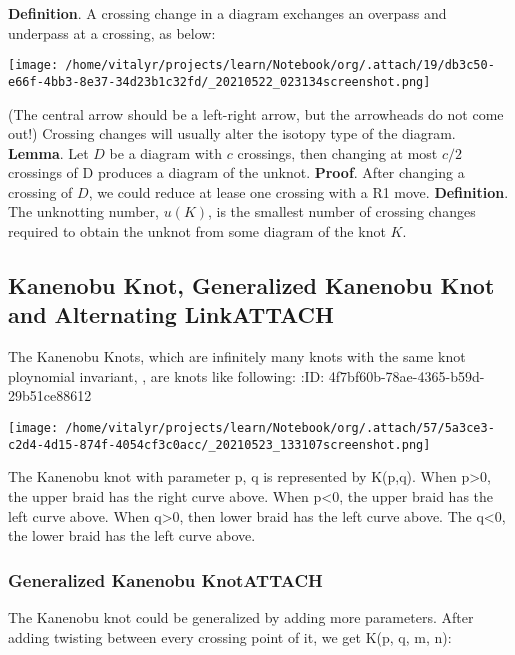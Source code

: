 \documentclass[a4paper]{article}
\begin{document}
\textbf{Definition}. A crossing change in a diagram exchanges an overpass and underpass at a crossing, as below:

\begin{center}
\texttt{[image: /home/vitalyr/projects/learn/Notebook/org/.attach/19/db3c50-e66f-4bb3-8e37-34d23b1c32fd/\_20210522\_023134screenshot.png]}
\end{center}
(The central arrow should be a left-right arrow, but the arrowheads do not come out!)
Crossing changes will usually alter the isotopy type of the diagram.
\textbf{Lemma}. Let \(D\) be a diagram with \(c\) crossings, then changing at most \(c/2\) crossings of D produces a diagram of the unknot.
\textbf{Proof}. After changing a crossing of \(D\), we could reduce at lease one crossing with a R1 move.
\textbf{Definition}. The unknotting number, \(u(K)\), is the smallest number of crossing changes required to obtain the unknot from some diagram of the knot \(K\).

\subsection{Kanenobu Knot, Generalized Kanenobu Knot and Alternating Link\hfill{}\textsc{ATTACH}}
\label{sec:orgb95a5be}
The  Kanenobu Knots, which are infinitely many knots with the same knot ploynomial invariant, \cite{kanenobuInfinitelyManyKnots1986} , are knots like following:
:ID:       4f7bf60b-78ae-4365-b59d-29b51ce88612

\begin{center}
\texttt{[image: /home/vitalyr/projects/learn/Notebook/org/.attach/57/5a3ce3-c2d4-4d15-874f-4054cf3c0acc/\_20210523\_133107screenshot.png]}
\end{center}

The Kanenobu knot with parameter p, q is represented  by K(p,q). When p>0, the upper braid  has the right curve above. When p<0, the upper braid has the left curve above. When q>0, then lower braid has the left curve above. The q<0, the lower braid has the left curve above.

\subsubsection{Generalized Kanenobu Knot\hfill{}\textsc{ATTACH}}
\label{sec:org1a4a929}
The Kanenobu knot could be generalized by adding more parameters. After adding twisting between every crossing point of it, we get K(p, q, m, n):
\end{document}

